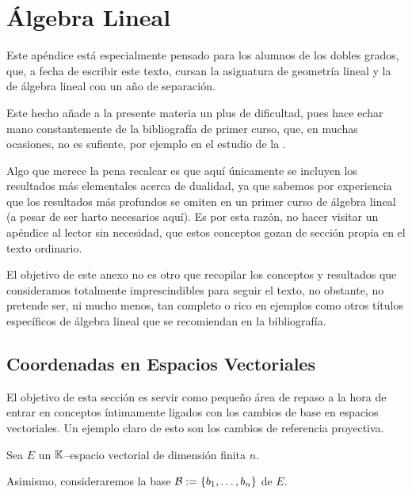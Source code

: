 \chapter{Álgebra Lineal}
Este apéndice está especialmente pensado para los alumnos de los dobles grados, que, a fecha de escribir este texto, cursan la asignatura de geometría lineal y la de álgebra lineal con un año de separación.

Este hecho añade a la presente materia un plus de dificultad, pues hace echar mano constantemente de la bibliografía de primer curso, que, en muchas ocasiones, no es sufiente, por ejemplo en el estudio de la .

Algo que merece la pena recalcar es que aquí únicamente se incluyen los resultados más elementales acerca de dualidad, ya que sabemos por experiencia que los resultados más profundos se omiten en un primer curso de álgebra lineal (a pesar de ser harto necesarios aquí). Es por esta razón, no hacer visitar un apéndice al lector sin necesidad, que estos conceptos gozan de sección propia en el texto ordinario.

El objetivo de este anexo no es otro que recopilar los conceptos y resultados que consideramos totalmente imprescindibles para seguir el texto, no obstante, no pretende ser, ni mucho menos, tan completo o rico en ejemplos como otros títulos específicos de álgebra lineal que se recomiendan en la bibliografía.
\section{Coordenadas en Espacios Vectoriales}
El objetivo de esta sección es servir como pequeño área de repaso a la hora de entrar en conceptos íntimamente ligados con los cambios de base en espacios vectoriales. Un ejemplo claro de esto son los cambios de referencia proyectiva.

Sea $E$ un $\mathbb{K}$--espacio vectorial de dimensión finita $n$.

Asimismo, consideraremos la base $\mathcal{B}:=\{b_1,\dots,b_n\}$ de $E$.

